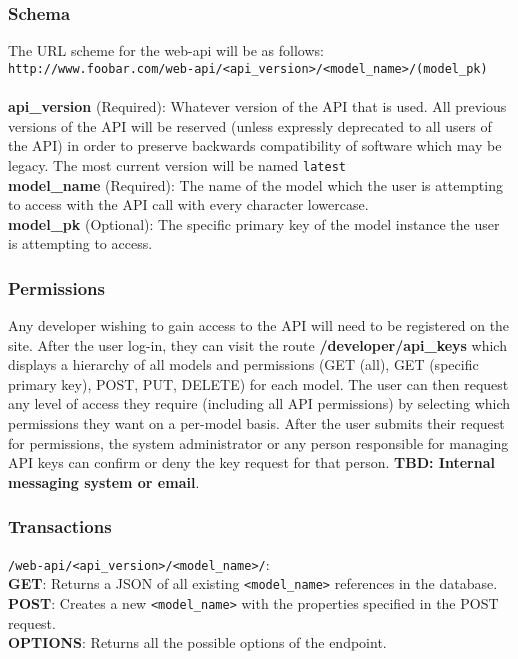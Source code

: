 \documentclass{article}
\begin{document}
\subsubsection{Schema}
The URL scheme for the web-api will be as follows: 
\\ \texttt{http://www.foobar.com/web-api/<api\_version>/<model\_name>/(model\_pk)}
\\ 
\\
\textbf{api\_version} (Required): Whatever version of the API that is used. All
previous versions of the API will be reserved (unless expressly deprecated to
all users of the API) in order to preserve backwards compatibility of software
which may be legacy. The most current version will be named \texttt{latest}
\\
\textbf{model\_name} (Required): The name of the model which the user is
attempting to access with the API call with every character lowercase. 
\\
\textbf{model\_pk} (Optional): The specific primary key of the model instance
the user is attempting to access. %

\subsubsection{Permissions}
Any developer wishing to gain access to the API will need to be registered on 
the site. After the user log-in, they can visit the route 
\textbf{/developer/api\_keys} which displays a hierarchy of all models and
permissions (GET (all), GET (specific primary key), POST, PUT, DELETE) for each
model. The user can then request any level of access they require (including
all API permissions) by selecting which permissions they want on a per-model
basis. After the user submits their request for permissions, the system
administrator or any person responsible for managing API keys can confirm or
deny the key request for that person. \textbf{TBD: Internal messaging system or
email}. %

\subsubsection{Transactions}
\texttt{/web-api/<api\_version>/<model\_name>/}:
\\
\textbf{GET}: Returns a JSON of all existing \texttt{<model\_name>} references in the
database.
\\
\textbf{POST}: Creates a new \texttt{<model\_name>} with the properties specified in the
POST request.
\\
\textbf{OPTIONS}: Returns all the possible options of the endpoint.
\end{document}
